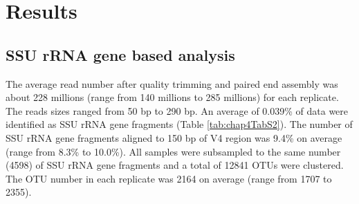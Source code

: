 \documentclass[]{msu-thesis}
\begin{document}
\section{Results}

\subsection{SSU rRNA gene based analysis}
The average read number after quality trimming and paired end assembly
was about 228 millions (range from 140 millions to 285 millions) for
each replicate. The reads sizes ranged from 50 bp to 290 bp. An average
of 0.039\% of data were identified as SSU rRNA gene fragments (Table
\ref{tab:chap4TabS2}). The number of SSU rRNA gene fragments aligned to
150 bp of V4 region was 9.4\% on average (range from 8.3\% to 10.0\%).
All samples were subsampled to the same number (4598) of SSU rRNA gene
fragments and a total of 12841 OTUs were clustered. The OTU number in
each replicate was 2164 on average (range from 1707 to 2355).
\end{document}
